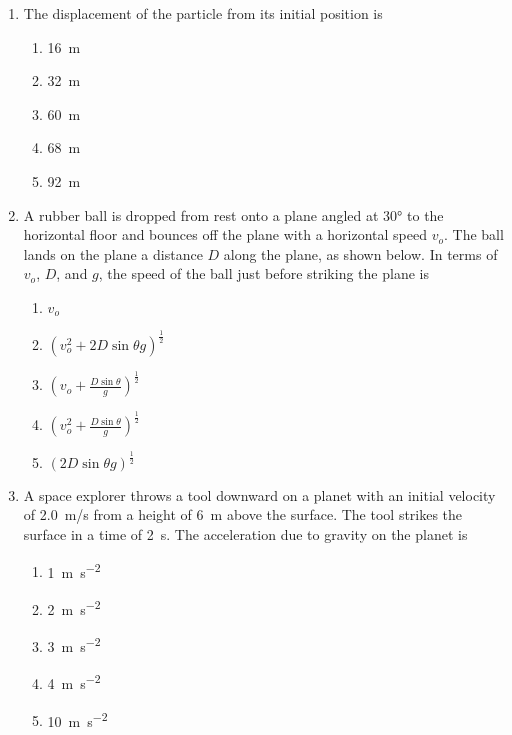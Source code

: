 \documentclass{../../oss-apphys}
\begin{document}
\begin{multicols}{2}
\begin{enumerate}[resume,leftmargin=18pt]
  \item The displacement of the particle from its initial position is
    \begin{enumerate}[noitemsep,topsep=0pt,leftmargin=18pt,label=(\Alph*)]
    \item\SI{16}{\metre}
    \item\SI{32}{\metre}
    \item\SI{60}{\metre}
    \item\SI{68}{\metre}
    \item\SI{92}{\metre}
    \end{enumerate}

%

  \item A rubber ball is dropped from rest onto a plane angled at \ang{30} to
    the horizontal floor and bounces off the plane with a horizontal speed
    $v_o$. The ball lands on the plane a distance $D$ along the plane, as shown
    below. In terms of $v_o$, $D$, and $g$, the speed of the ball just before
    striking the plane is
    \begin{center}
    \end{center}
    \begin{enumerate}[noitemsep,topsep=0pt]
    \item $v_o$
    \item $\displaystyle\left(v_o^2+2D\sin\theta g\right)^\frac{1}{2}$
    \item $\displaystyle\left(v_o+\frac{D\sin\theta}{g}\right)^\frac{1}{2}$
    \item $\displaystyle\left(v_o^2+\frac{D\sin\theta}{g}\right)^\frac{1}{2}$
    \item $\displaystyle\left(2D\sin\theta g\right)^\frac{1}{2}$
    \end{enumerate}
    \columnbreak
    
  \item A space explorer throws a tool downward on a planet with an initial
    velocity of \SI{2.0}{m/s} from a height of \SI{6}{m} above the surface. The
    tool strikes the surface in a time of \SI{2}{s}. The acceleration due to
    gravity on the planet is
    \begin{enumerate}[noitemsep,topsep=0pt,leftmargin=18pt,label=(\Alph*)]
    \item\SI{1 }{\metre\per\second^2}
    \item\SI{2 }{\metre\per\second^2}
    \item\SI{3 }{\metre\per\second^2}
    \item\SI{4 }{\metre\per\second^2}
    \item\SI{10}{\metre\per\second^2}
    \end{enumerate}
    

\end{enumerate}
\end{multicols}
\end{document}
